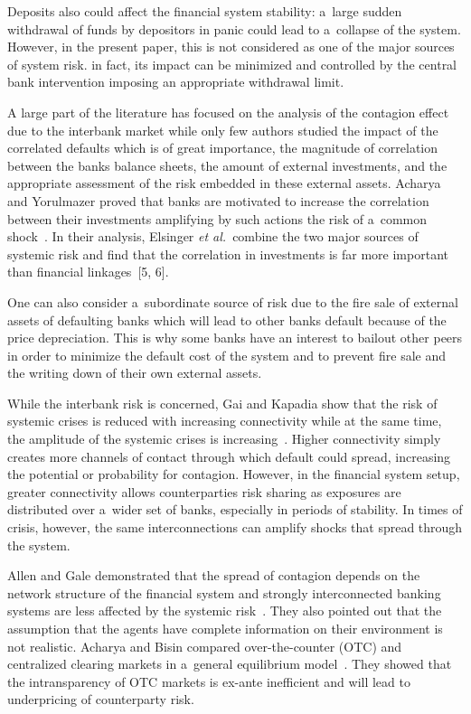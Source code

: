 \begin{multicols}{2}
Deposits also could affect the financial system stability:  a~large sudden 
withdrawal of funds  by depositors in panic  could lead to a~collapse of the 
system. However, in the present paper,  this is not considered as one of the 
major sources of system risk. in fact, its impact can be minimized and 
controlled by the central bank intervention imposing  an appropriate withdrawal 
limit.
{

}

A large part  of the literature has focused on the analysis of the contagion 
effect due to the interbank market while only few authors studied the impact 
of the correlated defaults which is of great importance, the magnitude 
of correlation between the banks balance sheets, the amount of external 
investments, and the appropriate assessment of the risk embedded in these 
external assets.
Acharya and Yorulmazer proved that banks are motivated to 
increase the correlation between their investments amplifying by such actions  
the risk of a~common shock~\cite{AY}. In their analysis, Elsinger {\it et al.}\ 
combine the two major sources  of systemic risk and find that the 
correlation in investments is far more important than financial linkages~[5, 6].

One can also consider a~subordinate source of risk due to the fire sale of 
external assets of defaulting banks which will lead to other banks default 
because of the price depreciation.  This is  why some banks have an interest to 
bailout other peers in order to minimize the default cost of the system and to 
prevent fire sale and the writing down of their own external assets.

While the interbank risk is concerned, Gai and Kapadia show  that the 
risk of systemic crises is reduced with increasing connectivity while
at the same time,
 the 
amplitude of the systemic crises is increasing~\cite{7a}. Higher 
connectivity simply creates more channels of contact through which default could 
spread, increasing the potential or probability for contagion. However, in the 
financial system setup, greater connectivity allows counterparties risk sharing 
as exposures are distributed over a~wider set of banks, especially in periods 
of stability. In times of crisis, however, the same interconnections can amplify 
shocks that spread through the system.

Allen and Gale demonstrated that the spread of contagion 
depends on the network structure of the financial system and  strongly 
interconnected banking systems are less affected by the systemic risk~\cite{Allen}. They also 
pointed out that the assumption that the agents have complete information on 
their environment is not realistic. Acharya and Bisin 
compared over-the-counter (OTC) and centralized clearing markets in a~general 
equilibrium model~\cite{AB}. They showed that the intransparency of OTC markets is ex-ante 
inefficient and will lead to underpricing of counterparty risk.


\end{multicols}
